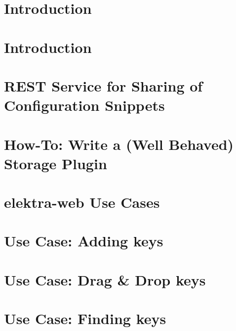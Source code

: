 \let\mypdfximage\pdfximage\def\pdfximage{\immediate\mypdfximage}\documentclass[twoside]{book}
\newcommand{\+}{\discretionary{\mbox{\scriptsize$\hookleftarrow$}}{}{}}
\begin{document}
\chapter{Introduction}
\label{doc_tutorials_run_all_tests_with_docker_md}

\chapter{Introduction}
\label{doc_tutorials_run_reformatting_script_with_docker_md}

\chapter{R\+E\+ST Service for Sharing of Configuration Snippets}
\label{doc_tutorials_snippet-sharing-rest-service_md}

\chapter{How-\/\+To\+: Write a (Well Behaved) Storage Plugin}
\label{doc_tutorials_storage-plugins_md}

\chapter{elektra-\/web Use Cases}
\label{doc_usecases_elektra_web_README_md}

\chapter{Use Case\+: Adding keys}
\label{doc_usecases_elektra_web_UC_adding_keys_md}

\chapter{Use Case\+: Drag \& Drop keys}
\label{doc_usecases_elektra_web_UC_drag_n_drop_md}

\chapter{Use Case\+: Finding keys}
\label{doc_usecases_elektra_web_UC_finding_keys_md}

\end{document}
